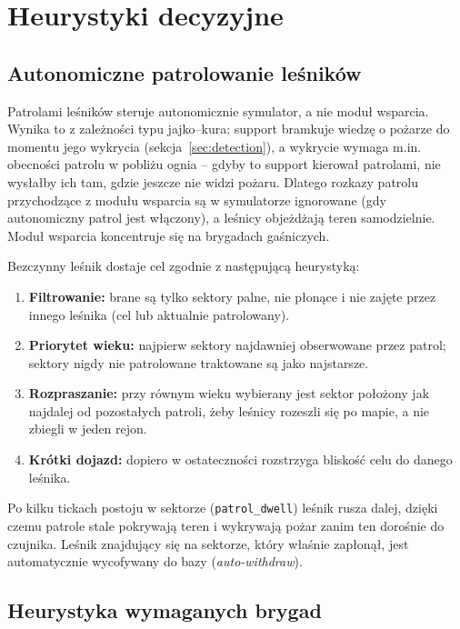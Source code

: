 \documentclass[11pt,a4paper]{article}
\begin{document}
\section{Heurystyki decyzyjne}

\subsection{Autonomiczne patrolowanie leśników}
\label{sec:patrol-heuristic}

Patrolami leśników steruje autonomicznie symulator, a nie moduł wsparcia. Wynika to z zależności typu jajko–kura: support bramkuje wiedzę o pożarze do momentu jego wykrycia (sekcja~\ref{sec:detection}), a wykrycie wymaga m.in. obecności patrolu w pobliżu ognia -- gdyby to support kierował patrolami, nie wysłałby ich tam, gdzie jeszcze nie widzi pożaru. Dlatego rozkazy patrolu przychodzące z modułu wsparcia są w symulatorze ignorowane (gdy autonomiczny patrol jest włączony), a leśnicy objeżdżają teren samodzielnie. Moduł wsparcia koncentruje się na brygadach gaśniczych.

Bezczynny leśnik dostaje cel zgodnie z następującą heurystyką:

\begin{enumerate}
    \item \textbf{Filtrowanie:} brane są tylko sektory palne, nie płonące i nie zajęte przez innego leśnika (cel lub aktualnie patrolowany).
    \item \textbf{Priorytet wieku:} najpierw sektory najdawniej obserwowane przez patrol; sektory nigdy nie patrolowane traktowane są jako najstarsze.
    \item \textbf{Rozpraszanie:} przy równym wieku wybierany jest sektor położony jak najdalej od pozostałych patroli, żeby leśnicy rozeszli się po mapie, a nie zbiegli w jeden rejon.
    \item \textbf{Krótki dojazd:} dopiero w ostateczności rozstrzyga bliskość celu do danego leśnika.
\end{enumerate}

Po kilku tickach postoju w sektorze (\texttt{patrol\_dwell}) leśnik rusza dalej, dzięki czemu patrole stale pokrywają teren i wykrywają pożar zanim ten dorośnie do czujnika. Leśnik znajdujący się na sektorze, który właśnie zapłonął, jest automatycznie wycofywany do bazy (\textit{auto-withdraw}).

\subsection{Heurystyka wymaganych brygad}
\end{document}
